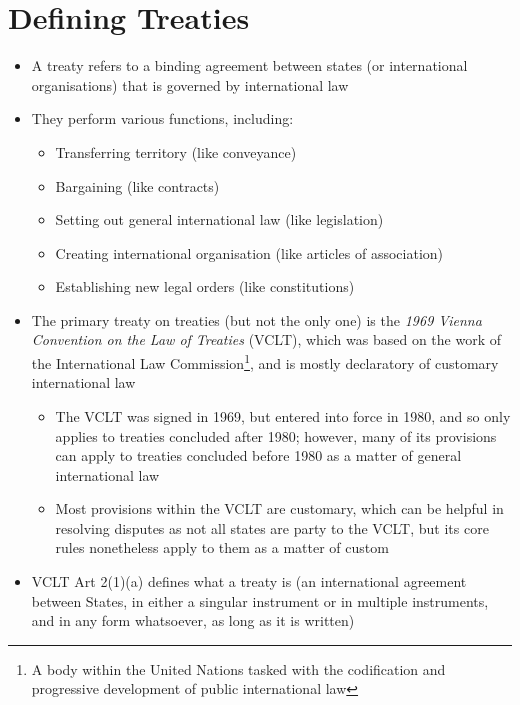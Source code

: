 \label{sec:Topic 3}
\section{Defining Treaties}
\begin{itemize}
    \item A treaty refers to a binding agreement between states (or international organisations) that is governed by international law
    \item They perform various functions, including:
    \begin{itemize}
        \item Transferring territory (like conveyance)
        \item Bargaining (like contracts)
        \item Setting out general international law (like legislation)
        \item Creating international organisation (like articles of association)
        \item Establishing new legal orders (like constitutions)
    \end{itemize}
    \item The primary treaty on treaties (but not the only one) is the \textit{1969 Vienna Convention on the Law of Treaties} (VCLT), which was based on the work of the International Law Commission\footnote{A body within the United Nations tasked with the codification and progressive development of public international law}, and is mostly declaratory of customary international law
    \begin{itemize}
        \item The VCLT was signed in 1969, but entered into force in 1980, and so only applies to treaties concluded after 1980; however, many of its provisions can apply to treaties concluded before 1980 as a matter of general international law
        \item Most provisions within the VCLT are customary, which can be helpful in resolving disputes as not all states are party to the VCLT, but its core rules nonetheless apply to them as a matter of custom
    \end{itemize}
    \item VCLT Art 2(1)(a) defines what a treaty is (an international agreement between States, in either a singular instrument or in multiple instruments, and in any form whatsoever, as long as it is written)
\end{itemize}
